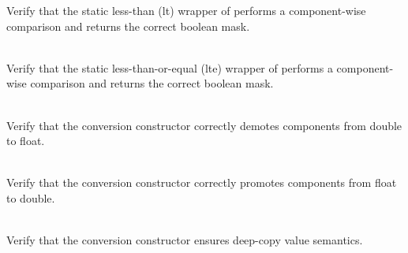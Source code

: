 \begin{DoxyRefList}
\label{test__test000057}%
%
Verify that the static less-\/than (lt) wrapper of  performs a component-\/wise comparison and returns the correct boolean mask.  
\item[{\parbox[t]{\linewidth}{Member \doxylink{group___f_g_m___vec4___l_t_e___comp_ga6ea51120faedc739f27775469ecc1204}{Vector4\+DComparison\+\_\+\+Static\+Wrapper\+\_\+\+Less\+Than\+Or\+Equal\+\_\+\+Returns\+Boolean\+Vector\+With\+Elements\+Less\+Than\+Or\+Equal\+As\+True} ()}}]\hfill \\
\label{test__test000063}%
%
Verify that the static less-\/than-\/or-\/equal (lte) wrapper of  performs a component-\/wise comparison and returns the correct boolean mask.  
\item[{\parbox[t]{\linewidth}{Member \doxylink{group___f_g_m___vec4___type___conv_ga0e0c185d92eb53264b7c9d6f8c087879}{Vector4\+DConversion\+Constructor\+\_\+\+Demotes\+Type} ()}}]\hfill \\
\label{test__test000151}%
%
Verify that the  conversion constructor correctly demotes components from double to float.  
\item[{\parbox[t]{\linewidth}{Member \doxylink{group___f_g_m___vec4___type___conv_gaa7a59762098ebf3aea4f06c9cfa6dbf4}{Vector4\+DConversion\+Constructor\+\_\+\+Promotes\+Type} ()}}]\hfill \\
\label{test__test000149}%
%
Verify that the  conversion constructor correctly promotes components from float to double.  
\item[{\parbox[t]{\linewidth}{Member \doxylink{group___f_g_m___vec4___type___conv_ga5a7fa4ed84cfa76e811ccd87f44749ad}{Vector4\+DConversion\+Constructor\+\_\+\+Returns\+New\+Instance} ()}}]\hfill \\
\label{test__test000150}%
%
Verify that the  conversion constructor ensures deep-\/copy value semantics.  
\item[{\parbox[t]{\linewidth}{Member \doxylink{group___f_g_m___vec4___dot_ga4ce7ca6be0e057f649edb97cc08fd82c}{Vector4\+DDot\+Product\+\_\+\+Anti\+Parallel\+Dot\+Product\+Returns\+Negative\+Scalar} ()}}]\hfill \\
\label{test__test000123}%

\end{DoxyRefList}
